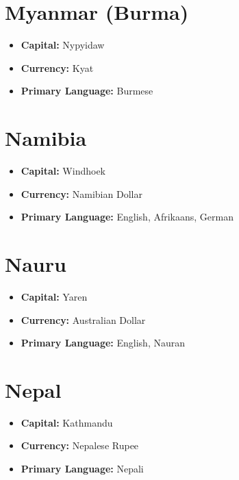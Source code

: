 \documentclass[a4paper,100pt,twoside]{book}
\begin{document}
\section*{\Huge Myanmar (Burma)}
\vspace{5mm} %
\begin{itemize}
	\item \textbf{Capital:} Nypyidaw
	\item \textbf{Currency:} Kyat
	\item \textbf{Primary Language:} Burmese
\end{itemize}

\section*{\Huge Namibia}
\vspace{5mm} %
\begin{itemize}
	\item \textbf{Capital:} Windhoek
	\item \textbf{Currency:} Namibian Dollar
	\item \textbf{Primary Language:} English, Afrikaans, German
\end{itemize}

\section*{\Huge Nauru}
\vspace{5mm} %
\begin{itemize}
	\item \textbf{Capital:} Yaren
	\item \textbf{Currency:} Australian Dollar
	\item \textbf{Primary Language:} English, Nauran
\end{itemize}

\section*{\Huge Nepal}
\vspace{5mm} %
\begin{itemize}
	\item \textbf{Capital:} Kathmandu
	\item \textbf{Currency:} Nepalese Rupee
	\item \textbf{Primary Language:} Nepali
\end{itemize}
\end{document}
